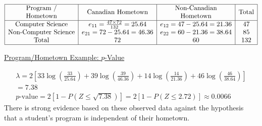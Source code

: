 \begin{exbox}
    \begin{example}
        \[ \begin{array}{|c|c|c|c|}
                \hline \begin{array}{c}
                    \text{Program /} \\
                    \text{Hometown}
                \end{array} & \text{Canadian Hometown}              & \begin{array}{c}
                    \text{Non-Canadian} \\
                    \text{Hometown}
                \end{array} & \text{Total} \\
                \hline
                \text{Computer Science}           & e_{11}=\frac{47 \times{72}}{132}=25.64 & e_{12}=47-25.64=21.36      & 47           \\
                \text{Non-Computer Science}       & e_{21}=72-25.64=46.36                 & e_{22}=60-21.36=38.64      & 85           \\
                \text{Total}                      & 72                                    & 60                         & 132          \\
                \hline
            \end{array} \]

        \underline{Program/Hometown Example: $ p $-Value}

        \[
            \begin{aligned}
                \lambda=2\left[33 \log \left(\frac{33}{25.64}\right)+39 \log \left(\frac{39}{46.36}\right)+14 \log \left(\frac{14}{21.36}\right)+46 \log \left(\frac{46}{38.64}\right)\right] \\
                =7.38                                                                                                                                                                         \\
                p \text{-value}=2[1-P(Z \leq \sqrt{7.38})]=2[1-P(Z \leq 2.72)] \approx 0.0066
            \end{aligned}
        \]
        There is strong evidence based on these observed data against the hypothesis that a student's program is independent of their hometown.
    \end{example}
\end{exbox}

